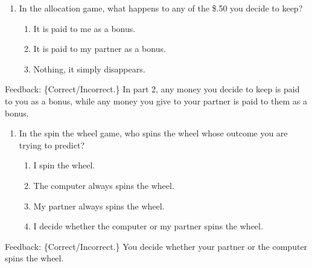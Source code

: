 \begin{description}[listparindent = 1.5em]
    \item[Part 2 Quiz Question 2] \hspace{1cm}
    \begin{enumerate} 
        \item In the allocation game, what happens to any of the \$.50 you decide to keep?
        \begin{enumerate}
            \item It is paid to me as a bonus.
            \item It is paid to my partner as a bonus.
            \item Nothing, it simply disappears.            
        \end{enumerate}
    \end{enumerate}

    Feedback: \{Correct/Incorrect.\} In part 2, any money you decide to keep
    is paid to you as a bonus, while any money you give to your partner is paid
    to them as a bonus.

    \item[Part 2 Quiz Question 3] \hspace{1cm}
    \begin{enumerate} 
        \item In the spin the wheel game, who spins the wheel whose outcome you are trying to predict?
        \begin{enumerate}
            \item I spin the wheel.
            \item The computer always spins the wheel.
            \item My partner always spins the wheel.
            \item I decide whether the computer or my partner spins the wheel.                   
        \end{enumerate}
    \end{enumerate}

    Feedback: \{Correct/Incorrect.\} You decide whether your partner or the
        computer spins the wheel.


\end{description}
